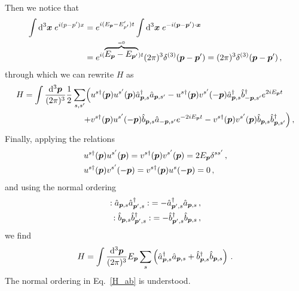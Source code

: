 \begin{sol}
\begin{equation}
    \end{equation}
    Then we notice that
    \begin{equation}
    \begin{split}
        \int {\rm d}^3 \boldsymbol{x} \;e^{i(p-p')x} &= e^{i(E_{\boldsymbol{p}}-E_{p'}')t}\int {\rm d}^3\boldsymbol{x} \;e^{-i(\boldsymbol{p}-\boldsymbol{p}')\cdot \boldsymbol{x}} \\ &= e^{i(\overbrace{E_{\boldsymbol{p}} - E_{\boldsymbol{p}'}}^{=0})t}(2\pi)^3 \delta^{(3)}(\boldsymbol{p} - \boldsymbol{p}')= (2\pi)^3 \delta^{(3)}(\boldsymbol{p} - \boldsymbol{p}')\,,
    \end{split}
    \end{equation}
    through which we can rewrite $H$ as
    \begin{equation}
    \begin{split}
        H = \int \frac{{\rm d}^3\boldsymbol{p}}{(2\pi)^3} \frac{1}{2} \sum_{s,s'} \Bigl( &u^{s\dagger}(\boldsymbol{p}) u^{s'}(\boldsymbol{p}) \hat{a}^\dagger_{\boldsymbol{p}, s}\hat{a}_{\boldsymbol{p}, s'}
        - u^{s\dagger}(\boldsymbol{p}) v^{s'}(-\boldsymbol{p}) \hat{a}^\dagger_{\boldsymbol{p}, s}\hat{b}^\dagger_{-\boldsymbol{p}, s'}e^{2iE_{\boldsymbol{p}} t} \\
        + & v^{s\dagger}(\boldsymbol{p}) u^{s'}(-\boldsymbol{p}) \hat{b}_{\boldsymbol{p}, s}\hat{a}_{-\boldsymbol{p}, s'} e^{-2iE_{\boldsymbol{p}} t}
        -v^{s\dagger}(\boldsymbol{p}) v^{s'}(\boldsymbol{p}) \hat{b}_{\boldsymbol{p}, s}\hat{b}^\dagger_{\boldsymbol{p}, s'}
        \Bigr)\,,
        \end{split}
    \end{equation}
    Finally, applying the relations
    \begin{align}
        &u^{s\dagger}(\boldsymbol{p}) u^{s'}(\boldsymbol{p}) = v^{s\dagger}(\boldsymbol{p}) v^{s'}(\boldsymbol{p}) = 2 E_{\boldsymbol{p}} \delta^{ss'} \,,\\ 
        &u^{s\dagger}(\boldsymbol{p}) v^{s'}(-\boldsymbol{p}) = v^{s\dagger}(\boldsymbol{p}) u^{s}(-\boldsymbol{p}) = 0\,,
    \end{align}
    and using the normal ordering
    \begin{equation}
    \begin{split}
        : \hat{a}_{\boldsymbol{p}, s} \hat{a}^\dagger_{\boldsymbol{p}', s} : \;=- \hat{a}^\dagger_{\boldsymbol{p}', s} \hat{a}_{\boldsymbol{p}, s} \,, \\
        : \hat{b}_{\boldsymbol{p}, s} \hat{b}^\dagger_{\boldsymbol{p}', s} : \;=- \hat{b}^\dagger_{\boldsymbol{p}', s} \hat{b}_{\boldsymbol{p}, s}\,,
        \end{split}
    \end{equation}
    we find
    \begin{equation}
    \label{H_ab}
        H = \int \frac{{\rm d}^3 \boldsymbol{p}}{(2\pi)^3} E_{\boldsymbol{p}} \sum_s \left( \hat{a}^\dagger_{\boldsymbol{p}, s} \hat{a}_{\boldsymbol{p}, s} + \hat{b}^\dagger_{\boldsymbol{p}, s} \hat{b}_{\boldsymbol{p}, s}\right)\,.
    \end{equation}
    The normal ordering in Eq.~\eqref{H_ab} is understood.
\end{sol}